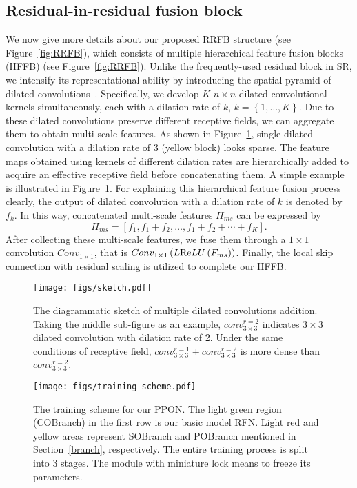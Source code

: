 \documentclass[preprint]{elsarticle}
\begin{document}
\subsection{Residual-in-residual fusion block}
We now give more details about our proposed RRFB structure (see Figure~\ref{fig:RRFB}), which consists of multiple hierarchical feature fusion blocks (HFFB) (see Figure~\ref{fig:RRFB}). Unlike the frequently-used residual block in SR, we intensify its representational ability by introducing the spatial pyramid of dilated convolutions~\cite{ESPNet}. Specifically, we develop $K$ $n \times n$ dilated convolutional kernels simultaneously, each with a dilation rate of $k$, $k = \left\{ {1, \ldots ,K} \right\}$. Due to these dilated convolutions preserve different receptive fields, we can aggregate them to obtain multi-scale features. As shown in Figure~\ref{fig:sketch}, single dilated convolution with a dilation rate of 3 (yellow block) looks sparse. The feature maps obtained using kernels of different dilation rates are hierarchically added to acquire an effective receptive field before concatenating them. A simple example is illustrated in Figure~\ref{fig:sketch}. For explaining this hierarchical feature fusion process clearly, the output of dilated convolution with a dilation rate of $k$ is denoted by $f_k$. In this way, concatenated multi-scale features $H_{ms}$ can be expressed by
\begin{equation}
{H_{ms}} = \left[ {{f_1},{f_1} + {f_2}, \ldots ,{f_1} + {f_2} +  \cdots  + {f_K}} \right] .
\end{equation}
After collecting these multi-scale features, we fuse them through a $1 \times 1$ convolution $Con{v_{1 \times 1}}$, that is $Con{v_{1 \times 1}}\left( {L{\mathop{\rm Re}\nolimits} LU\left( {{F_{ms}}} \right)} \right)$. Finally, the local skip connection with residual scaling is utilized to complete our HFFB.
\begin{figure}[htpb]
	\begin{center}
		\texttt{[image: figs/sketch.pdf]}
	\end{center}
	\caption{The diagrammatic sketch of multiple dilated convolutions addition. Taking the middle sub-figure as an example, $conv_{3 \times 3}^{r = 2}$ indicates $3 \times 3$ dilated convolution with dilation rate of 2. Under the same conditions of receptive field, $conv_{3 \times 3}^{r = 1}+conv_{3 \times 3}^{r = 2}$ is more dense than $conv_{3 \times 3}^{r = 2}$.}
	\label{fig:sketch}
\end{figure}
\begin{figure}[htpb]
	\begin{center}
		\texttt{[image: figs/training\_scheme.pdf]}
	\end{center}
	\caption{The training scheme for our PPON. The light green region (COBranch) in the first row is our basic model RFN. Light red and yellow areas represent SOBranch and POBranch mentioned in Section~\ref{branch}, respectively. The entire training process is split into 3 stages. The module with miniature lock means to freeze its parameters.}
	\label{fig:training-scheme}
\end{figure}
\end{document}
